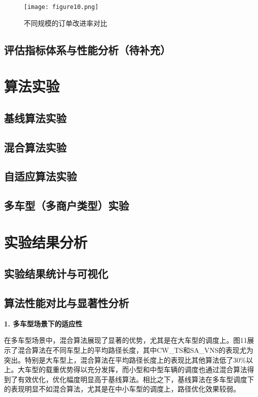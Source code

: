 \documentclass[12pt,a4paper,twoside]{ctexbook}
\begin{document}
\begin{figure}[H]
    \centering
    \texttt{[image: figure10.png]} %
    \caption{不同规模的订单改进率对比}
    \label{fig:improvement rate}
\end{figure}

\subsection{评估指标体系与性能分析（待补充）}

\section{算法实验}
\subsection{基线算法实验}
\subsection{混合算法实验}
\subsection{自适应算法实验}
\subsection{多车型（多商户类型）实验}

\section{实验结果分析}
\subsection{实验结果统计与可视化}
\subsection{算法性能对比与显著性分析}


\textbf{1. 多车型场景下的适应性}

在多车型场景中，混合算法展现了显著的优势，尤其是在大车型的调度上。图11展示了混合算法在不同车型上的平均路径长度，其中CW\_TS和SA\_VNS的表现尤为突出。特别是大车型上，混合算法在平均路径长度上的表现比其他算法低了30\%以上。大车型的载重优势得以充分发挥，而小型和中型车辆的调度也通过混合算法得到了有效优化，优化幅度明显高于基线算法。相比之下，基线算法在多车型调度下的表现明显不如混合算法，尤其是在中小车型的调度上，路径优化效果较弱。
\end{document}
